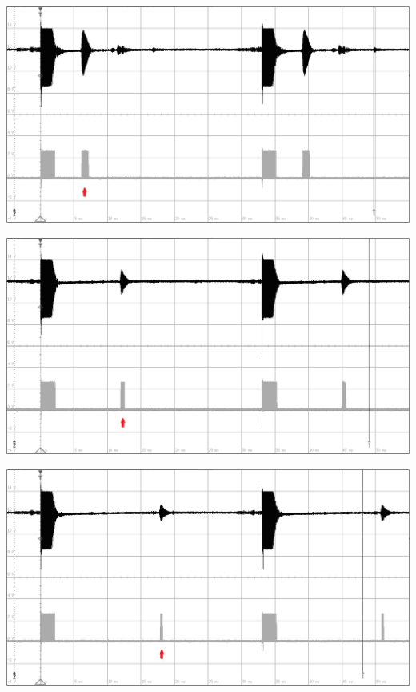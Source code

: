 \begin{minipage}{0.5\textwidth}
\includegraphics[width=1\textwidth%
]{Abbildungen/MessungenP2/5V/1mb.PNG}
\label{fig:5v1m}
\end{minipage}
\begin{minipage}{0.5\textwidth}
\includegraphics[width=1\textwidth%
]{Abbildungen/MessungenP2/5V/2mb.PNG}
\label{fig:5v2m}
\end{minipage}
\begin{minipage}{0.5\textwidth}
\includegraphics[width=1\textwidth%
]{Abbildungen/MessungenP2/5V/3mb.PNG}
\label{fig:5v3m}
\end{minipage}
